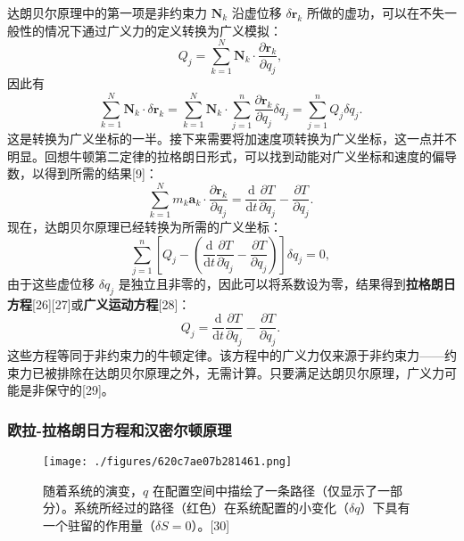 达朗贝尔原理中的第一项是非约束力 \( \mathbf{N}_k \) 沿虚位移 \( \delta \mathbf{r}_k \) 所做的虚功，可以在不失一般性的情况下通过广义力的定义转换为广义模拟：
\[
Q_j = \sum_{k=1}^{N} \mathbf{N}_k \cdot \frac{\partial \mathbf{r}_k}{\partial q_j},~
\]
因此有
\[
\sum_{k=1}^{N} \mathbf{N}_k \cdot \delta \mathbf{r}_k = \sum_{k=1}^{N} \mathbf{N}_k \cdot \sum_{j=1}^{n} \frac{\partial \mathbf{r}_k}{\partial q_j} \delta q_j = \sum_{j=1}^{n} Q_j \delta q_j.~
\]
这是转换为广义坐标的一半。接下来需要将加速度项转换为广义坐标，这一点并不明显。回想牛顿第二定律的拉格朗日形式，可以找到动能对广义坐标和速度的偏导数，以得到所需的结果[9]：
\[
\sum_{k=1}^{N} m_k \mathbf{a}_k \cdot \frac{\partial \mathbf{r}_k}{\partial q_j} = \frac{\mathrm{d}}{\mathrm{d} t} \frac{\partial T}{\partial \dot{q}_j} - \frac{\partial T}{\partial q_j}.~
\]
现在，达朗贝尔原理已经转换为所需的广义坐标：
\[
\sum_{j=1}^{n}\left[Q_j - \left(\frac{\mathrm{d}}{\mathrm{d} t} \frac{\partial T}{\partial \dot{q}_j} - \frac{\partial T}{\partial q_j}\right)\right]\delta q_j = 0,~
\]
由于这些虚位移 \(\delta q_j\) 是独立且非零的，因此可以将系数设为零，结果得到\textbf{拉格朗日方程}[26][27]或\textbf{广义运动方程}[28]：
\[
Q_{j} = \frac{\mathrm{d}}{\mathrm{d} t} \frac{\partial T}{\partial \dot{q}_{j}} - \frac{\partial T}{\partial q_{j}}.~
\]
这些方程等同于非约束力的牛顿定律。该方程中的广义力仅来源于非约束力——约束力已被排除在达朗贝尔原理之外，无需计算。只要满足达朗贝尔原理，广义力可能是非保守的[29]。
\subsubsection{欧拉-拉格朗日方程和汉密尔顿原理}
\begin{figure}[ht]
\centering
\texttt{[image: ./figures/620c7ae07b281461.png]}
\caption{随着系统的演变，\( q \) 在配置空间中描绘了一条路径（仅显示了一部分）。系统所经过的路径（红色）在系统配置的小变化（\(\delta q\)）下具有一个驻留的作用量（\(\delta S = 0\)）。[30]} \label{fig_LGL_7}
\end{figure}